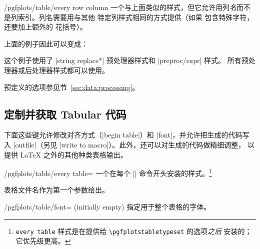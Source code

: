 \documentclass[a4paper,doc2]{ltxdoc}
\begin{document}
\begin{stylekey}{/pgfplots/table/every row  column }
    一个与上面类似的样式，但它允许用列\emph{名}而不是列索引。列名需要用与其他
    特定列样式相同的方式提供（如果  包含特殊字符，还要加上额外的
    花括号）。

    上面的例子因此可以变成：
\begin{codeexample}[]
\end{codeexample}
    这个例子使用了 |string replace*| 预处理器样式和 |preproc/expr| 样式。
    所有预处理器或后处理器样式都可以使用。

    预定义的选项参见节~\ref{sec:data:processing}。
\end{stylekey}


\subsection{定制并获取 Tabular 代码}

下面这些键允许修改对齐方式（|begin table|）和 |font|，并允许把生成的代码写入
|outfile|（另见 |write to macro|）。此外，还可以对生成的代码做精细调整，
以提供 \LaTeX{} 之外的其他种类表格输出。

\begin{stylekey}{/pgfplots/table/every table=}
    一个在每个 |\pgfplotstabletypeset| 命令开头安装的样式。\footnote{\texttt{every table}
    样式是在提供给 \texttt{\textbackslash pgfplotstabletypeset} 的选项\emph{之后}
    安装的；它优先级更高。}

    表格文件名作为第一个参数给出。
\end{stylekey}

\begin{key}{/pgfplots/table/font= (initially empty)}
    指定用于整个表格的字体。
\end{key}
\end{document}
